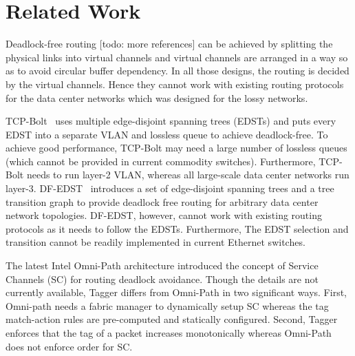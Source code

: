 \section{Related Work}\label{sec:related}




Deadlock-free routing \cite{dally,duato93,dally93} [todo: more references] can be achieved by splitting the physical links into virtual channels and virtual channels are arranged in a way so as to avoid circular buffer dependency. In all those designs, the routing is decided by the virtual channels. Hence they cannot work with existing routing protocols for the data center networks which was designed for the lossy networks.

TCP-Bolt~\cite{tcpbolt} uses multiple edge-disjoint spanning trees (EDSTs) and puts every EDST into a separate VLAN and lossless queue to achieve deadlock-free. To achieve good performance, TCP-Bolt may need a large number of lossless queues (which cannot be provided in current commodity switches). Furthermore, TCP-Bolt needs to run layer-2 VLAN, whereas all large-scale data center networks run layer-3. 
DF-EDST~\cite{dfedst16} introduces a set of edge-disjoint spanning trees and a tree transition graph to provide deadlock free routing for arbitrary data center network topologies. DF-EDST, however, cannot work with existing routing protocols as it needs to follow the EDSTs. Furthermore, The EDST selection and transition cannot be readily implemented in current Ethernet switches.

The latest Intel Omni-Path architecture \cite{omnipath} introduced the concept of Service Channels (SC) for routing deadlock avoidance. Though the details are not currently available, Tagger differs from Omni-Path in two significant ways. First, Omni-path needs a fabric manager to dynamically setup SC whereas the tag match-action rules are pre-computed and statically configured. Second, Tagger enforces that the tag of a packet increases monotonically whereas Omni-Path does not enforce order for SC.


